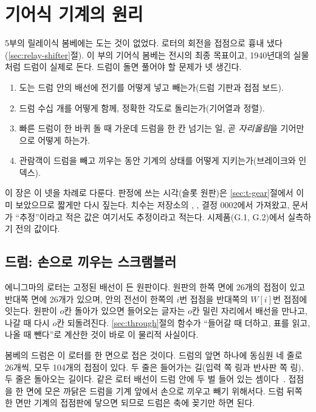 \chapter{기어식 기계의 원리}\label{ch:50-gear-mechanics}

5부의 릴레이식 봄베에는 도는 것이 없었다. 로터의 회전을 접점으로 흉내 냈다(\ref{sec:relay-shifter}절). 이 부의
기어식 봄베는 전시의 최종 목표이고, 1940년대의 실물처럼 드럼이 실제로 돈다. 드럼이 돌면 풀어야 할 문제가
넷 생긴다.

\begin{enumerate}
\item 도는 드럼 안의 배선에 전기를 어떻게 넣고 빼는가(드럼 기판과 접점 보드).
\item 드럼 수십 개를 어떻게 함께, 정확한 각도로 돌리는가(기어열과 정렬).
\item 빠른 드럼이 한 바퀴 돌 때 가운데 드럼을 한 칸 넘기는 일, 곧 \emph{자리올림}을 기어만으로 어떻게 하는가.
\item 관람객이 드럼을 빼고 끼우는 동안 기계의 상태를 어떻게 지키는가(브레이크와 인덱스).
\end{enumerate}

이 장은 이 넷을 차례로 다룬다. 판정에 쓰는 시각(슬롯 원판)은 \ref{sec:t-gear}절에서 이미 보았으므로 짧게만
다시 짚는다. 치수는 저장소의 , , 결정 0002에서 가져왔고, 문서가
``추정''이라고 적은 값은 여기서도 추정이라고 적는다. 시제품(G.1, G.2)에서 실측하기 전의 값이다.

\section{드럼: 손으로 끼우는 스크램블러}\label{sec:gm-drum}

\Why 에니그마의 로터는 고정된 배선이 든 원판이다. 원판의 한쪽 면에 26개의 접점이 있고 반대쪽 면에 26개가 있으며,
안의 전선이 한쪽의 $i$번 접점을 반대쪽의 $W[i]$번 접점에 잇는다. 원판이 $o$칸 돌아가 있으면 들어오는 글자는
$o$칸 밀린 자리에서 배선을 만나고, 나갈 때 다시 $o$칸 되돌려진다. \ref{sec:through}절의  함수가
``들어갈 때 더하고, 표를 읽고, 나올 때 뺀다''로 계산한 것이 바로 이 물리적 사실이다.

봄베의 드럼은 이 로터를 한 면으로 접은 것이다. 드럼의 앞면 하나에 동심원 네 줄로 26개씩, 모두 104개의 접점이
있다. 두 줄은 들어가는 길(입력 쪽 링과 반사판 쪽 링), 두 줄은 돌아오는 길이다. 같은 로터 배선이 드럼 안에 두
벌 들어 있는 셈이다~\cite{ellsbury1998bombe}. 접점을 한 면에 모은 까닭은 드럼을 기계 앞에서 손으로 끼우고 빼기
위해서다. 드럼 뒤쪽 한 면만 기계의 접점판에 닿으면 되므로 드럼은 축에 꽂기만 하면 된다.

